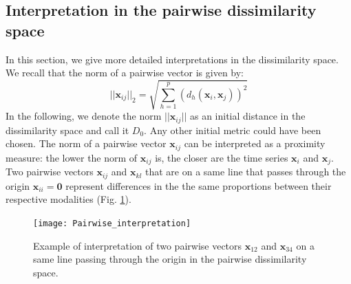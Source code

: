\subsection{Interpretation in the pairwise dissimilarity space}

In this section, we give more detailed interpretations in the dissimilarity space. 
We recall that the norm of a pairwise vector is given by: 
\begin{equation}
||\textbf{x}_{ij}||_2 = \sqrt{\sum\limits_{h=1}^{p} \left( d_h(\textbf{x}_{i},\textbf{x}_{j}) \right) ^2}
\end{equation}
In the following, we denote the norm $||\textbf{x}_{ij}||$ as an initial distance in the dissimilarity space and call it $D_0$. Any other initial metric could have been chosen. The norm of a pairwise vector $\textbf{x}_{ij}$ can be interpreted as a proximity measure: the lower the norm of $\textbf{x}_{ij}$ is, the closer are the time series $\textbf{x}_{i}$ and $\textbf{x}_{j}$. Two pairwise vectors $\textbf{x}_{ij}$ and $\textbf{x}_{kl}$ that are on a same line that passes through the origin $\textbf{x}_{ii} = \textbf{0}$ represent differences in the the same proportions between their respective modalities (Fig. \ref{fig:pairwise_interpretation}). 

\begin{figure}[h!]
	\centering
	\texttt{[image: Pairwise\_interpretation]}
	\caption{Example of interpretation of two pairwise vectors $\textbf{x}_{12}$ and $\textbf{x}_{34}$ on a same line passing through the origin in the pairwise dissimilarity space.}
	\label{fig:pairwise_interpretation}
\end{figure}

